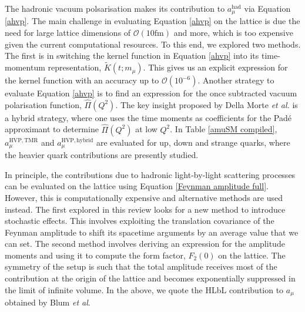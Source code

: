 \documentclass{article}
\numberwithin{equation}{section} %
\begin{document}
The hadronic vacuum polsarisation makes its contribution to $a_\mu^\mathrm{had}$ via Equation \ref{ahvp}. The main challenge in evaluating Equation \ref{ahvp} on the lattice is due the need for large lattice dimensions of $\mathcal{O}(10\mathrm{fm})$ and more, which is too expensive given the current computational resources. To this end, we explored two methods. The first is in switching the kernel function in Equation \ref{ahvp} into its time-momentum representation, $\tilde{K}(t;m_\mu)$. This gives us an explicit expression for the kernel function with an accuracy up to $\mathcal{O}(10^{-6})$. Another strategy to evaluate Equation \ref{ahvp} is to find an expression for the once subtracted vacuum polarisation function, $\hat{\Pi}(Q^2)$. The key insight proposed by Della Morte \textit{et al.} is a hybrid strategy, where one uses the time moments as coefficients for the Pad\'e approximant to determine $\hat{\Pi}(Q^2)$ at low $Q^2$. In Table \ref{amuSM compiled}, $a_\mu^\mathrm{HVP,TMR}$ and $a_\mu^\mathrm{HVP,hybrid}$ are evaluated for up, down and strange quarks, where the heavier quark contributions are presently studied.

%
%

In principle, the contributions due to hadronic light-by-light scattering processes can be evaluated on the lattice using Equation \ref{Feynman amplitude full}. However, this is computationally expensive and alternative methods are used instead. The first explored in this review looks for a new method to introduce stochastic effects. This involves exploiting the translation covariance of the Feynman amplitude to shift its spacetime arguments by an average value that we can set. The second method involves deriving an expression for the amplitude moments and using it to compute the form factor, $F_2(0)$ on the lattice. The symmetry of the setup is such that the total amplitude receives most of the contribution at the origin of the lattice and becomes exponentially suppressed in the limit of infinite volume. In the above, we quote the HLbL contribution to $a_\mu$ obtained by Blum \textit{et al}.
\end{document}
